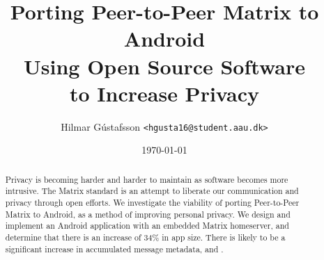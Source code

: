 \documentclass[11pt,notitlepage]{report}
\title{%
	Porting Peer-to-Peer Matrix to Android\\
	\large{%
		Using Open Source Software\\
		to Increase Privacy
	}
}
\author{Hilmar Gústafsson \texttt{<hgusta16@student.aau.dk>}}
\date{\small\today} 			%
\begin{document}
\sloppy							%
\maketitle
\begin{abstract}
	Privacy is becoming harder and harder to maintain as software becomes more intrusive.
	The Matrix standard is an attempt to liberate our communication and privacy through open efforts.
	We investigate the viability of porting Peer-to-Peer Matrix to Android, as a method of improving personal privacy.
	We design and implement an Android application with an embedded Matrix homeserver, and determine that there is an increase of 34\% in app size.
	There is likely to be a significant increase in accumulated message metadata, and .
\end{abstract}
\setcounter{tocdepth}{1}
\tableofcontents
{}










\end{document}
